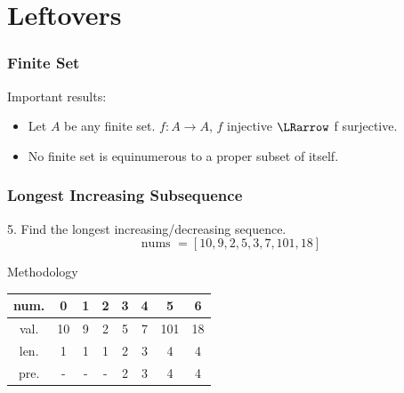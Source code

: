 \documentclass{beamer}
\begin{document}
\section{Leftovers}
\begin{frame}
    \frametitle{Finite Set}
    Important results:
    \begin{itemize}
        \item Let $A$ be any finite set. 
        $f : A \to A$, $f$  injective $\LRarrow$ f
        surjective.
        \item No finite set is equinumerous to a proper subset of itself.
    \end{itemize}
    \vv
\end{frame}
\begin{frame}
    \frametitle{Longest Increasing Subsequence}
    5. Find the longest increasing/decreasing sequence.
    $$\text{nums }= [10, 9, 2, 5, 3, 7, 101, 18]$$
    \begin{block}{Methodology}
        \begin{table}[]
            \begin{tabular}{||c|ccccccc||}
            \toprule
            num.&0  &1  &2  &3  &4  &5  &6  \\ 
            \midrule
            val.&10  &9  &2  &5  &7  &101  &18  \\ \hline
            len.&1  &1  &1  &2  &3  &4  &4  \\ \hline
            pre.&-  &-  &-  &2  &3  &4  &4  \\ 
            \bottomrule
            \end{tabular}
            \end{table}
    \end{block}
\end{frame}
\end{document}
